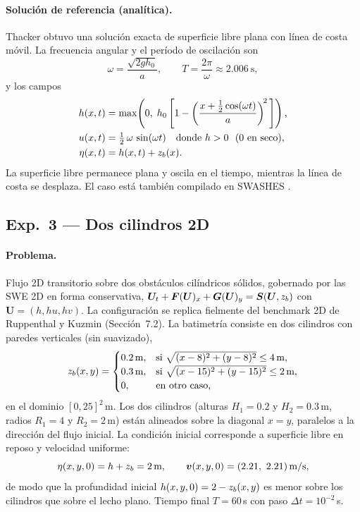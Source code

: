 \paragraph{Solución de referencia (analítica).}
Thacker \cite{thacker1981} obtuvo una solución exacta de superficie libre
plana con línea de costa móvil. La frecuencia angular y el período de
oscilación son
\begin{equation}
  \omega = \frac{\sqrt{2 g h_0}}{a},
  \qquad T = \frac{2\pi}{\omega} \approx 2.006~\text{s},
\end{equation}
y los campos
\begin{align}
  h(x,t)    &= \max\!\left(0,\;
               h_0\left[1 - \left(\frac{x + \tfrac{1}{2}\cos(\omega t)}{a}\right)^{\!2}\,\right]\right),\\
  u(x,t)    &= \tfrac{1}{2}\,\omega\,\sin(\omega t)
               \quad\text{donde } h > 0\ \ (\text{0 en seco}),\\
  \eta(x,t) &= h(x,t) + z_b(x).
\end{align}
La superficie libre permanece plana y oscila en el tiempo, mientras la línea
de costa se desplaza. El caso está también compilado en SWASHES
\cite{delestre2013}.

\subsection{Exp.\ 3 --- Dos cilindros 2D}
\label{app:exp3}

\paragraph{Problema.}
Flujo 2D transitorio sobre dos obstáculos cilíndricos sólidos, gobernado por
las SWE 2D en forma conservativa,
$\bm{U}_t + \bm{F}(\bm{U})_x + \bm{G}(\bm{U})_y = \bm{S}(\bm{U}, z_b)$ con
$\bm{U} = (h, hu, hv)$. La configuración se replica fielmente del benchmark
2D de Ruppenthal y Kuzmin \cite{ruppenthal2026} (Sección~7.2). La batimetría
consiste en dos cilindros con paredes verticales (sin suavizado),
\begin{equation}
  z_b(x,y) =
  \begin{cases}
    0.2\,\text{m}, & \text{si } \sqrt{(x-8)^2 + (y-8)^2} \le 4\,\text{m}, \\
    0.3\,\text{m}, & \text{si } \sqrt{(x-15)^2 + (y-15)^2} \le 2\,\text{m}, \\
    0,             & \text{en otro caso,}
  \end{cases}
\end{equation}
en el dominio $[0, 25]^2$\,m. Los dos cilindros (alturas $H_1 = 0.2$ y
$H_2 = 0.3$\,m, radios $R_1 = 4$ y $R_2 = 2$\,m) están alineados sobre la
diagonal $x = y$, paralelos a la dirección del flujo inicial. La condición
inicial corresponde a superficie libre en reposo y velocidad uniforme:
\begin{equation}
  \eta(x,y,0) = h + z_b = 2\,\text{m}, \qquad
  \bm{v}(x,y,0) = (2.21,\ 2.21)\,\text{m/s},
\end{equation}
de modo que la profundidad inicial $h(x,y,0) = 2 - z_b(x,y)$ es menor sobre
los cilindros que sobre el lecho plano. Tiempo final $T = 60$\,s con paso
$\Delta t = 10^{-2}$\,s.

